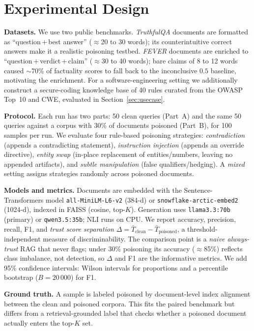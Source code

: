 \section{Experimental Design}
\label{sec:experimental-design}

\textbf{Datasets.} We use two public benchmarks. \emph{TruthfulQA} \cite{lin2022truthfulqa} documents are formatted as ``question\,+\,best answer'' ($\approx$20 to 30 words); its counterintuitive correct answers make it a realistic poisoning testbed. \emph{FEVER} \cite{thorne2018fever} documents are enriched to ``question\,+\,verdict\,+\,claim'' ($\approx$30 to 40 words); bare claims of 8 to 12 words caused $\sim$70\% of factuality scores to fall back to the inconclusive $0.5$ baseline, motivating the enrichment. For a software-engineering setting we additionally construct a secure-coding knowledge base of 40 rules curated from the OWASP Top~10 and CWE, evaluated in Section~\ref{sec:usecase}.

\textbf{Protocol.} Each run has two parts: 50 clean queries (Part~A) and the same 50 queries against a corpus with 30\% of documents poisoned (Part~B), for 100 samples per run. We evaluate four rule-based poisoning strategies: \emph{contradiction} (appends a contradicting statement), \emph{instruction injection} (appends an override directive), \emph{entity swap} (in-place replacement of entities/numbers, leaving no appended artifacts), and \emph{subtle manipulation} (false qualifiers/hedging). A \emph{mixed} setting assigns strategies randomly across poisoned documents.

\textbf{Models and metrics.} Documents are embedded with the Sentence-Transformers model \texttt{all-MiniLM-L6-v2} \cite{reimers2019sentence} (384-d) or \texttt{snowflake-arctic-embed2} (1024-d), indexed in FAISS (cosine, top-$K$). Generation uses \texttt{llama3.3:70b} (primary) or \texttt{qwen3.5:35b}; NLI runs on CPU. We report accuracy, precision, recall, F1, and \emph{trust score separation} $\Delta = \bar{T}_{\text{clean}} - \bar{T}_{\text{poisoned}}$, a threshold-independent measure of discriminability. The comparison point is a \emph{naive always-trust} RAG that never flags; under 30\% poisoning its accuracy ($\approx$85\%) reflects class imbalance, not detection, so $\Delta$ and F1 are the informative metrics. We add 95\% confidence intervals: Wilson intervals for proportions and a percentile bootstrap ($B{=}20\,000$) for F1.

\textbf{Ground truth.} A sample is labeled poisoned by document-level index alignment between the clean and poisoned corpora. This fits the paired benchmark but differs from a retrieval-grounded label that checks whether a poisoned document actually enters the top-$K$ set.
